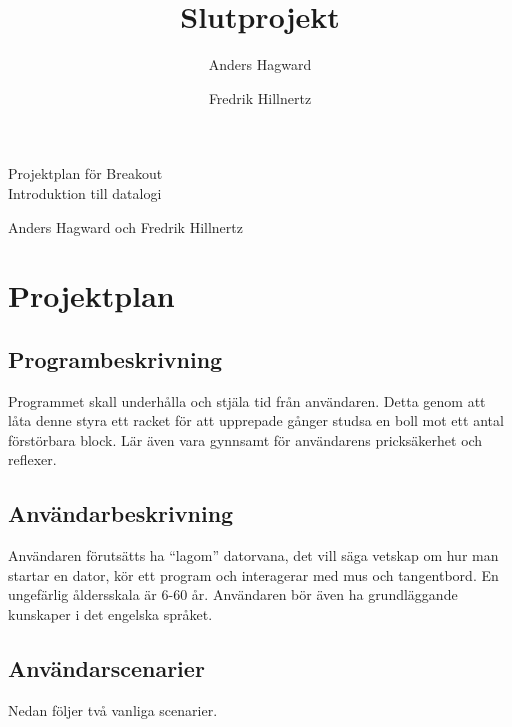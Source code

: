 \documentclass[11pt,a4paper]{article}
\author{Anders Hagward \and Fredrik Hillnertz}
\title{Slutprojekt}
\begin{document}
\thispagestyle{empty}
\begin{center}
\huge Projektplan för Breakout
\\
\Large Introduktion till datalogi

\normalsize Anders Hagward och Fredrik Hillnertz
\end{center}
\newpage

\tableofcontents
\newpage

\section{Projektplan}

\subsection{Programbeskrivning}
Programmet skall underhålla och stjäla tid från användaren. Detta genom att låta denne styra ett racket för att upprepade gånger studsa en boll mot ett antal förstörbara block. Lär även vara gynnsamt för användarens pricksäkerhet och reflexer.

\subsection{Användarbeskrivning}
Användaren förutsätts ha ``lagom'' datorvana, det vill säga vetskap om hur man startar en dator, kör ett program och interagerar med mus och tangentbord. En ungefärlig åldersskala är 6-60 år. Användaren bör även ha grundläggande kunskaper i det engelska språket.

\subsection{Användarscenarier}
Nedan följer två vanliga scenarier.
\end{document}
